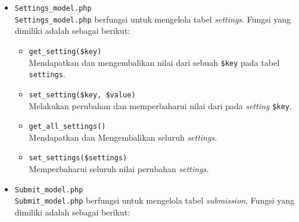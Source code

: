 \begin{itemize}
	      \begin{itemize}
		      \item \verb|_generate_scoreboard($assignment_id)| \\
		            Menghasilkan \textit{scoreboard} untuk sebuah \textit{assignment} dari nilai akhir seluruh \textit{submission}.
		      \item \verb|update_scoreboards()| \\
		            memperbaharui \textit{scoreboard} untuk seluruh \textit{assignment}.
		      \item \verb|update_scoreboard($assignment_id)| \\
		            Memperbaharui \textit{scoreboard} untuk \textit{assignment}.
		      \item \verb|get_scoreboard($assignment_id)| \\
		            Mendapatkan dan mengembalikan \textit{scoreboard} pada  \textit{assignment}.
	      \end{itemize}

	\item \verb|Settings_model.php| \\
		  	\verb|Settings_model.php| berfungsi untuk mengelola tabel \textit{settings}. Fungsi yang dimiliki adalah sebagai berikut:
	
	      \begin{itemize}
		      \item \verb|get_setting($key)| \\
		            Mendapatkan dan mengembalikan nilai dari sebuah \verb|$key| pada tabel \verb|settings|.
		      \item \verb|set_setting($key, $value)| \\
		            Melakukan perubahan dan memperbaharui nilai dari pada \textit{setting} \verb|$key|.
		      \item \verb|get_all_settings()| \\
		            Mendapatkan dan Mengembalikan seluruh \textit{settings}.
		      \item \verb|set_settings($settings)| \\
		            Memperbaharui seluruh nilai perubahan \textit{settings}.
	      \end{itemize}

	\item \verb|Submit_model.php| \\
		  	\verb|Submit_model.php| berfungsi untuk mengelola tabel \textit{submission}, Fungsi yang dimiliki adalah sebagai berikut:
			

\end{itemize}
